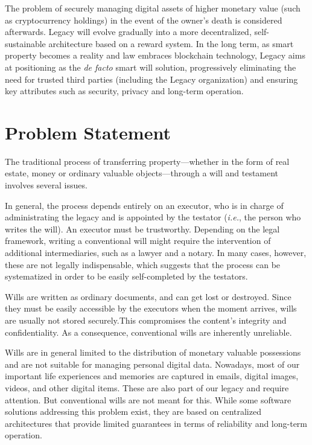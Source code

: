 The problem of securely managing digital assets of higher monetary value (such as cryptocurrency holdings) in the event of the owner's death is considered afterwards.
Legacy will evolve gradually into a more decentralized, self-sustainable architecture based on a reward system.
In the long term, as smart property becomes a reality and law embraces blockchain technology, Legacy aims at positioning as the \textit{de facto} smart will solution, progressively eliminating the need for trusted third parties (including the Legacy organization) and ensuring key attributes such as security, privacy and long-term operation.

\section{Problem Statement} %
\label{sec:problem_statement}

The traditional process of transferring property---whether in the form of real estate, money or ordinary valuable objects---through a will and testament involves several issues.

In general, the process depends entirely on an executor, who is in charge of administrating the legacy and is appointed by the testator (\textit{i.e.}, the person who writes the will). An executor must be trustworthy. Depending on the legal framework, writing a conventional will might require the intervention of additional intermediaries, such as a lawyer and a notary. In many cases, however, these are not legally indispensable, which suggests that the process can be systematized in order to be easily self-completed by the testators. 

Wills are written as ordinary documents, and can get lost or destroyed. Since they must be easily accessible by the executors when the moment arrives, wills are usually not stored securely.This compromises the content's integrity and confidentiality. As a consequence, conventional wills are inherently unreliable.

Wills are in general limited to the distribution of monetary valuable possessions and are not suitable for managing personal digital data. Nowadays, most of our important life experiences and memories are captured in emails, digital images, videos, and other digital items. These are also part of our legacy and require attention. But conventional wills are not meant for this. While some software solutions addressing this problem exist, they are based on centralized architectures that provide limited guarantees in terms of reliability and long-term operation.


